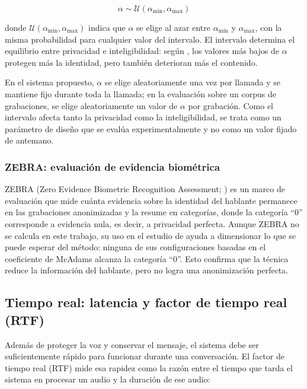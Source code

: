 \documentclass[10pt,twocolumn]{article}
\newcommand{\textcite}[1]{\citet{#1}}
\begin{document}
\begin{equation}\label{eq:uniform}
\alpha \sim \mathcal{U}(\alpha_{\min}, \alpha_{\max})
\end{equation}

\noindent donde $\mathcal{U}(\alpha_{\min},\alpha_{\max})$ indica que $\alpha$ se elige al azar entre $\alpha_{\min}$ y $\alpha_{\max}$, con la misma probabilidad para cualquier valor del intervalo. El intervalo determina el equilibrio entre privacidad e inteligibilidad: según \textcite{patino2021}, los valores más bajos de $\alpha$ protegen más la identidad, pero también deterioran más el contenido.

En el sistema propuesto, $\alpha$ se elige aleatoriamente una vez por llamada y se mantiene fijo durante toda la llamada; en la evaluación sobre un corpus de grabaciones, se elige aleatoriamente un valor de $\alpha$ por grabación. Como el intervalo afecta tanto la privacidad como la inteligibilidad, se trata como un parámetro de diseño que se evalúa experimentalmente y no como un valor fijado de antemano.

\subsubsection{ZEBRA: evaluación de evidencia biométrica}\label{sec:2.7.1}

ZEBRA (Zero Evidence Biometric Recognition Assessment; \citealp{nautsch2020}) es un marco de evaluación que mide cuánta evidencia sobre la identidad del hablante permanece en las grabaciones anonimizadas y la resume en categorías, donde la categoría ``0'' corresponde a evidencia nula, es decir, a privacidad perfecta. Aunque ZEBRA no se calcula en este trabajo, su uso en el estudio de \textcite{patino2021} ayuda a dimensionar lo que se puede esperar del método: ninguna de sus configuraciones basadas en el coeficiente de McAdams alcanza la categoría ``0''. Esto confirma que la técnica reduce la información del hablante, pero no logra una anonimización perfecta.

\subsection{Tiempo real: latencia y factor de tiempo real (RTF)}\label{sec:2.8}

Además de proteger la voz y conservar el mensaje, el sistema debe ser suficientemente rápido para funcionar durante una conversación. El factor de tiempo real (RTF) mide esa rapidez como la razón entre el tiempo que tarda el sistema en procesar un audio y la duración de ese audio:
\end{document}
